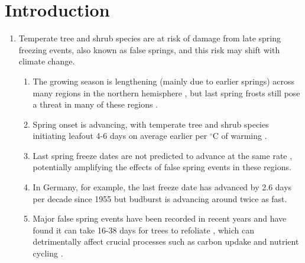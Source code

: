 \documentclass{article}\usepackage[]{graphicx}\usepackage[]{color}
\begin{document}
\section*{Introduction}
\begin{enumerate}
\item Temperate tree and shrub species are at risk of damage from late spring freezing events, also known as false springs, and this risk may shift with climate change.
\begin{enumerate}
\item The growing season is lengthening (mainly due to earlier springs) across many regions in the northern hemisphere \citep{Chen2005, Liu2006, Kukal2018}, but last spring frosts still pose a threat in many of these regions \citep{Wypych2016a}.
\item Spring onset is advancing, with temperate tree and shrub species initiating leafout 4-6 days on average earlier per $^{\circ}$C of warming \citep{Wolkovich2012, IPCC2014}.
\item Last spring freeze dates are not predicted to advance at the same rate \citep{Inouye2008, Martin2010, Labe2016, Sgubin2018}, potentially amplifying the effects of false spring events in these regions.
\item In Germany, for example, the last freeze date has advanced by 2.6 days per decade since 1955 \citep{Zohner2016} but budburst is advancing around twice as fast.
\item Major false spring events have been recorded in recent years and have found it can take 16-38 days for trees to refoliate \citep{Gu2008, Augspurger2009, Augspurger2013, Menzel2015}, which can detrimentally affect crucial processes such as carbon updake and nutrient cycling \citep{Hufkens2012, Richardson2013, Klosterman2018}.
\end{enumerate}



\end{enumerate}
\end{document}
